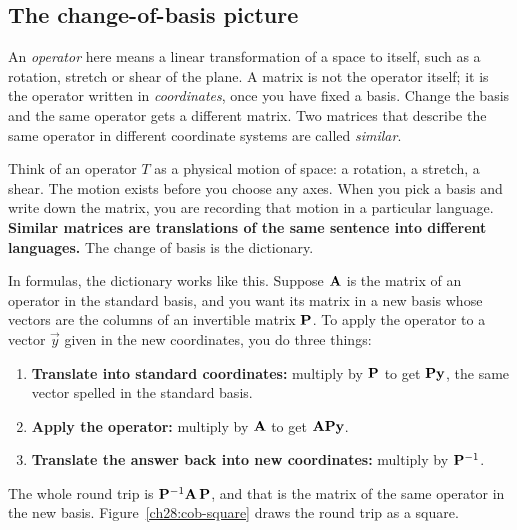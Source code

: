 \subsection{The change-of-basis picture}

An \emph{operator} here means a linear transformation of a space to itself, such as a
rotation, stretch or shear of the plane. A matrix is not the operator itself; it is
the operator written in \emph{coordinates}, once you have fixed a basis. Change the
basis and the same operator gets a different matrix. Two matrices that describe the
same operator in different coordinate systems are called \emph{similar}.

\begin{intuitionbox}
Think of an operator $T$ as a physical motion of space: a rotation, a stretch, a shear.
The motion exists before you choose any axes. When you pick a basis and write down the
matrix, you are recording that motion in a particular language. \textbf{Similar
matrices are translations of the same sentence into different languages.} The change of
basis is the dictionary.
\end{intuitionbox}

In formulas, the dictionary works like this. Suppose $\mathbf{A}$ is the matrix of an operator in
the standard basis, and you want its matrix in a new basis whose vectors are the columns
of an invertible matrix $\mathbf{P}$. To apply the operator to a vector $\vec{y}$ given in
the new coordinates, you do three things:

\begin{enumerate}
\item \textbf{Translate into standard coordinates:} multiply by $\mathbf{P}$ to get
  $\mathbf{P}\mathbf{y}$, the same vector spelled in the standard basis.
\item \textbf{Apply the operator:} multiply by $\mathbf{A}$ to get $\mathbf{A}\mathbf{P}\mathbf{y}$.
\item \textbf{Translate the answer back into new coordinates:} multiply by $\mathbf{P}^{-1}$.
\end{enumerate}

The whole round trip is $\mathbf{P}^{-1} \mathbf{A}\, \mathbf{P}$, and that is the matrix of the
same operator in the new basis. Figure~\ref{ch28:cob-square} draws the round trip as a
square.


